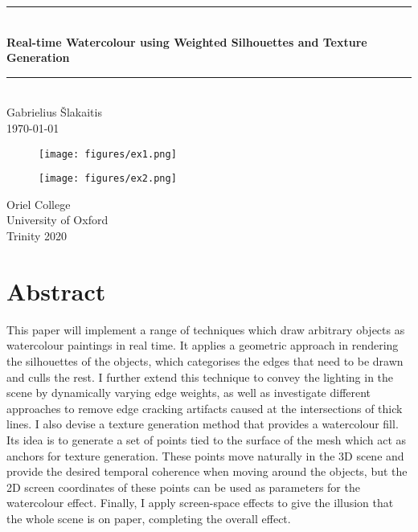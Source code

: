 \documentclass[a4paper,10pt]{article}
\begin{document}
\begin{titlepage}
  \begin{center}

  \rule{\textwidth}{1pt}\\
  \vspace{0.4cm}
  \huge
  \textbf{Real-time Watercolour using Weighted Silhouettes and Texture Generation}
  \rule{\textwidth}{1pt}\\
  \vspace{0.5cm}
  Gabrielius \v{S}lakaitis\\
  \Large
  \today
  \vfill
  
  \begin{figure}[htbp!]
    \centering
    \begin{minipage}{0.33\columnwidth}
      \texttt{[image: figures/ex1.png]}
    \end{minipage}
    \begin{minipage}{0.33\columnwidth}
      \texttt{[image: figures/ex2.png]}
    \end{minipage}
  \end{figure}
  \vspace{0.5cm}
  Oriel College\\
  University of Oxford\\
  Trinity 2020\\
  \end{center}
\end{titlepage}

\begin{spacing}{0}
  \tableofcontents
\end{spacing}
\newpage

\section*{Abstract}

This paper will implement a range of techniques which draw arbitrary objects as watercolour paintings in real time. It applies a geometric approach in rendering the silhouettes of the objects, which categorises the edges that need to be drawn and culls the rest. I further extend this technique to convey the lighting in the scene by dynamically varying edge weights, as well as investigate different approaches to remove edge cracking artifacts caused at the intersections of thick lines. I also devise a texture generation method that provides a watercolour fill. Its idea is to generate a set of points tied to the surface of the mesh which act as anchors for texture generation. These points move naturally in the 3D scene and provide the desired temporal coherence when moving around the objects, but the 2D screen coordinates of these points can be used as parameters for the watercolour effect. Finally, I apply screen-space effects to give the illusion that the whole scene is on paper, completing the overall effect.
\end{document}
